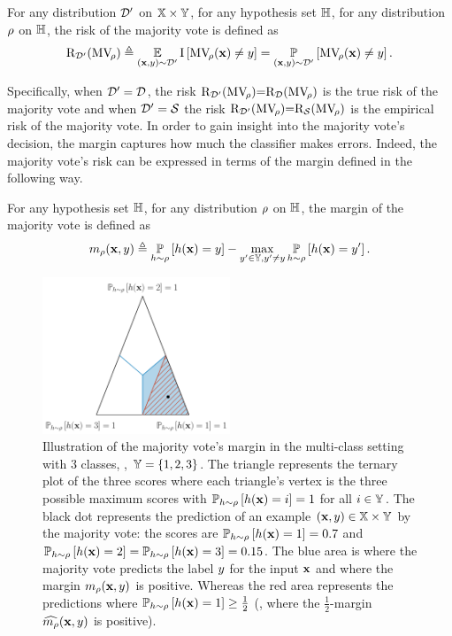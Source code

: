 \begin{definition}
For any distribution $\mathcal{D}'$ on $\mathbb{X}\times\mathbb{Y}$, for any hypothesis set $\mathbb{H}$, for any distribution $\rho$ on $\mathbb{H}$, the risk of the majority vote is defined as 
\begin{align*}
\text{R}_{\mathcal{D}'}(\text{MV}_{\!\rho}) \triangleq \operatorname*{\mathbb{E}}_{(\mathbf{x}, y)\sim\mathcal{D}'} \operatorname{I}\left[ \text{MV}_{\!\rho}(\mathbf{x}) \ne y\right] =\operatorname*{\mathbb{P}}_{(\mathbf{x},y)\sim\mathcal{D}'}\left[ \text{MV}_{\!\rho}(\mathbf{x}) \ne y \right].
\end{align*}
\label{chap:pac-bayes:def:mv-risk}
\end{definition}

Specifically, when $\mathcal{D}'=\mathcal{D}$, the risk $\text{R}_{\mathcal{D}'}(\text{MV}_{\!\rho}){=}\text{R}_{\mathcal{D}}(\text{MV}_{\!\rho})$ is the true risk of the majority vote and when $\mathcal{D}'=\mathcal{S}$ the risk $\text{R}_{\mathcal{D}'}(\text{MV}_{\!\rho}){=}\text{R}_{\mathcal{S}}(\text{MV}_{\!\rho})$ is the empirical risk of the majority vote.
In order to gain insight into the majority vote's decision, the margin captures how much the classifier makes errors.
Indeed, the majority vote's risk can be expressed in terms of the margin defined in the following way. 

\begin{definition}
For any hypothesis set $\mathbb{H}$, for any distribution $\rho$ on $\mathbb{H}$, the margin of the majority vote is defined as
\begin{align*}
    m_{\rho}(\mathbf{x},y) \triangleq \operatorname*{\mathbb{P}}_{h\sim\rho}\left[ h(\mathbf{x})=y \right] - \max_{y'\in\mathbb{Y}, y'\ne y}\operatorname*{\mathbb{P}}_{h\sim\rho}\left[ h(\mathbf{x})=y' \right].
\end{align*}
\end{definition}


\begin{figure}[t]
    \centering
    \includegraphics[width=0.5\textwidth]{chapter_2/figures/margin.pdf}
    \caption[Illustration of the Margin of the Majority Vote]{%
    Illustration of the majority vote's margin in the multi-class setting with 3 classes, \ie, $\mathbb{Y}=\{1, 2, 3\}$.
    The triangle represents the ternary plot of the three scores where each triangle's vertex is the three possible maximum scores with $\operatorname*{\mathbb{P}}_{h\sim\rho}\left[ h(\mathbf{x})=i \right]=1$ for all $i\in\mathbb{Y}$.
    The black dot represents the prediction of an example $(\mathbf{x}, y)\in\mathbb{X}\times\mathbb{Y}$ by the majority vote: the scores are $\operatorname*{\mathbb{P}}_{h\sim\rho}\left[ h(\mathbf{x})=1 \right]=0.7$ and $\operatorname*{\mathbb{P}}_{h\sim\rho}\left[ h(\mathbf{x})=2 \right]=\operatorname*{\mathbb{P}}_{h\sim\rho}\left[ h(\mathbf{x})=3 \right]=0.15$.
    The blue area is where the majority vote predicts the label $y$ for the input $\mathbf{x}$ and where the margin $m_{\rho}(\mathbf{x},y)$ is positive.
    Whereas the red area represents the predictions where $\operatorname*{\mathbb{P}}_{h\sim\rho}\left[ h(\mathbf{x})=1 \right]\ge\frac{1}{2}$ (\ie, where the $\frac{1}{2}$-margin $\widehat{m_{\rho}}(\mathbf{x},y)$ is positive).
    }
    \label{chap:pac-bayes:fig:margin}
\end{figure}

